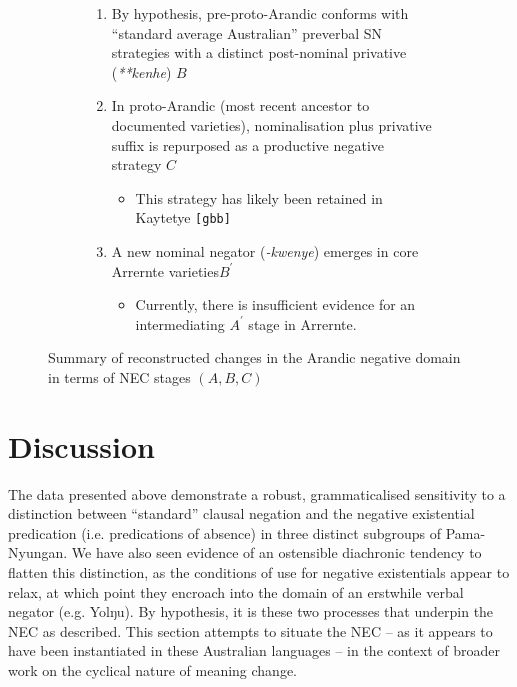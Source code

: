 \documentclass[output=paper,draft,draftmode,colorlinks,citecolor=brown]{langscibook}
\begin{document}
\noindent\begin{figure}
    \begin{subfigure}{.4\textwidth}
\end{subfigure}
    \begin{subfigure}{.58\textwidth}
	\begin{enumerate}[label={\textbf{\roman*})}]%
		\item By hypothesis, pre-proto-Arandic conforms with ``standard average Australian'' preverbal SN strategies with a distinct post-nominal privative (\textit{**kenhe}) $B$
		\item In proto-Arandic (most recent ancestor to documented varieties), nominalisation plus privative suffix is repurposed as a productive negative strategy $C$
		\begin{itemize}
			\item This strategy has likely been retained in Kaytetye \texttt{[gbb]}
		\end{itemize}
		\item A new nominal negator (\textit{-kwenye}) emerges in core Arrernte varieties${B^\prime}$
		\begin{itemize}
			\item Currently, there is insufficient evidence for an intermediating ${A^\prime}$ stage in Arrernte.
		\end{itemize}	
	\end{enumerate}
    \end{subfigure}
	\caption{Summary of reconstructed changes in the Arandic negative domain in terms of NEC stages $ (A,B,C) $}\label{fig:austr-arandic}
\end{figure}

\section{Discussion}\label{sec:austr-6}

The data presented above demonstrate a robust, grammaticalised sensitivity to a distinction between ``standard'' clausal negation and the negative existential predication (i.e. predications of absence) in three distinct subgroups of Pama-Nyungan. We have also seen evidence of an ostensible diachronic tendency to flatten this distinction, as the conditions of use for negative existentials appear to relax, at which point they encroach into the domain of an erstwhile verbal negator (e.g. Yolŋu). By hypothesis, it is these two processes that underpin the NEC as described. This section attempts to situate the NEC -- as it appears to have been instantiated in these Australian languages -- in the context of broader work on the cyclical nature of meaning change.
\end{document}
